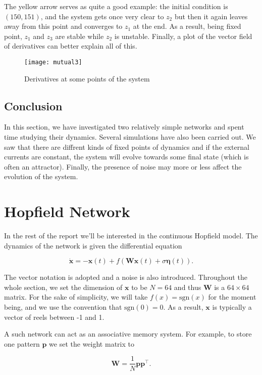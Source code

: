 The yellow arrow serves as quite a good example: the initial condition is 
$(150, 151)$, and the system gets once very clear to $z_2$ but then it again
leaves away from this point and converges to $z_1$ at the end. As a result,
being fixed point, $z_1$ and $z_3$ are stable while $z_2$ is unstable. 
Finally, a plot of the vector field of derivatives can better 
explain all of this.

\begin{figure}[H]
  \centering
  \texttt{[image: mutual3]}
  \caption{Derivatives at some points of the system}
\end{figure}

\subsection{Conclusion}

In this section, we have investigated two relatively simple networks and spent
time studying their dynamics. Several simulations have also been carried out.
We saw that there are diffrent kinds of fixed points of dynamics and if the
external currents are constant, the system will evolve towards some final 
state (which is often an attractor). Finally, the presence of noise may more
or less affect the evolution of the system.


\section{Hopfield Network}

In the rest of the report we'll be interested in the continuous Hopfield 
model. The dynamics of the network is given the differential equation

\[\dot{\mathbf{x}} = -\mathbf{x}(t) + f(\mathbf{Wx}(t) + 
  \sigma\mathbf{\eta}(t)).\]

\noindent
The vector notation is adopted and a noise is also introduced.
Throughout the whole section, we set the dimension of $\mathbf{x}$ to be 
$N=64$ and thus $\mathbf{W}$ is a $64\times64$ matrix. For the sake of 
simplicity, we will take $f(x) = \mathrm{sgn}(x)$ for the moment being, and 
we use the convention that $\mathrm{sgn}(0) = 0$. As a result, $\mathbf{x}$
is typically a vector of reels between -1 and 1.

A such network can act as an associative memory system. For example, to store
one pattern $\mathbf{p}$ we set the weight matrix to 

\[\mathbf{W} = \frac{1}{N} \mathbf{p}\mathbf{p}^{\top}.\]

